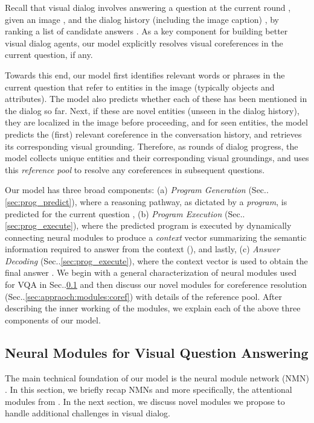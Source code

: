 \documentclass[runningheads]{llncs}
\makeatletter
\DeclareRobustCommand\onedot{\futurelet\@let@token\@onedot}
\def\@onedot{\ifx\@let@token.\else.\null\fi\xspace}
\def\Sec{Sec\onedot}
\makeatother
\begin{document}
Recall that visual dialog \cite{visdial} involves answering a
question  at the current round , given an image , and the
dialog history (including the image caption) , by ranking a list of 
 candidate answers 
.
As a key component for building better visual dialog agents, our model
explicitly resolves visual coreferences in the current question, if
any.

Towards this end, our model first identifies relevant words or phrases in the 
current question that refer to entities in the image (typically objects and 
attributes).
The model also predicts whether each of these has been mentioned in the dialog
so far.
Next, if these are novel entities (unseen in the dialog history), they are 
localized in the image before proceeding, and for seen entities, the model 
predicts the (first) relevant coreference in the conversation history, and retrieves its corresponding visual grounding.
Therefore, as rounds of dialog progress, the model collects unique entities and
their corresponding visual groundings, and uses this \textit{reference pool} to
resolve any coreferences in subsequent questions.

Our model has three broad components:
(a) \textit{Program Generation} (\Sec\ref{sec:prog_predict}), where a reasoning
pathway, as dictated by a \textit{program},
is predicted for the current question ,
(b) \textit{Program Execution} (\Sec\ref{sec:prog_execute}), where the
predicted program is executed by dynamically connecting neural modules
\cite{andreas_naacl16,andreas16cvpr,hu2017learning} to produce a
\textit{context} vector
summarizing the semantic information required to answer  from the context
(), and lastly,
(c) \textit{Answer Decoding} (\Sec\ref{sec:prog_execute}), where the
context vector  is used to obtain the final answer .
We begin with a general characterization of neural modules used for VQA in \Sec\ref{sec:appraoch:modules:vqa} and then discuss our
novel modules for coreference resolution (\Sec\ref{sec:appraoch:modules:coref}) with details of the reference pool.
After describing the inner working of the modules, we explain each 
of the above three components of our model.
\subsection{Neural Modules for Visual Question Answering}
\label{sec:appraoch:modules:vqa}

The main technical foundation of our model is the neural module network (NMN) \cite{andreas16cvpr}.
In this section, we briefly recap NMNs and more specifically, the attentional
modules from \cite{hu2017learning}.
In the next section, we discuss novel modules we propose to handle additional 
challenges in visual dialog.
\end{document}
